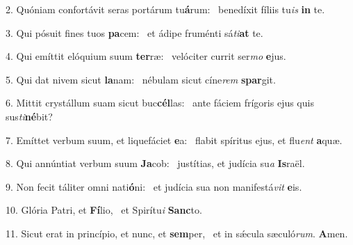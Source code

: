 2. Quóniam confortávit seras portárum tu\textbf{á}rum: \ast\  benedíxit fíliis tu\textit{is} \textbf{in} te.\

3. Qui pósuit fines tuos \textbf{pa}cem: \ast\  et ádipe fruménti sá\textit{ti}\textbf{at} te.\

4. Qui emíttit elóquium suum \textbf{ter}ræ: \ast\  velóciter currit ser\textit{mo} \textbf{e}jus.\

5. Qui dat nivem sicut \textbf{la}nam: \ast\  nébulam sicut cíne\textit{rem} \textbf{spar}git.\

6. Mittit crystállum suam sicut buc\textbf{cél}las: \ast\  ante fáciem frígoris ejus quis sus\textit{ti}\textbf{né}bit?\

7. Emíttet verbum suum, et liquefáciet \textbf{e}a: \ast\  flabit spíritus ejus, et flu\textit{ent} \textbf{a}quæ.\

8. Qui annúntiat verbum suum \textbf{Ja}cob: \ast\  justítias, et judícia su\textit{a} \textbf{Is}raël.\

9. Non fecit táliter omni nati\textbf{ó}ni: \ast\  et judícia sua non manifestá\textit{vit} \textbf{e}is.\

10. Glória Patri, et \textbf{Fí}lio, \ast\  et Spirítu\textit{i} \textbf{Sanc}to.\

11. Sicut erat in princípio, et nunc, et \textbf{sem}per, \ast\  et in sǽcula sæculó\textit{rum}. \textbf{A}men.\

